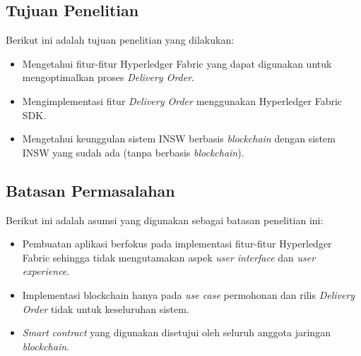 \subsection{Tujuan Penelitian}
\label{sec:tujuan}
Berikut ini adalah tujuan penelitian yang dilakukan:
\begin{itemize}
	\item Mengetahui fitur-fitur Hyperledger Fabric yang dapat digunakan untuk mengoptimalkan proses \textit{Delivery Order}.
	\item Mengimplementasi fitur \textit{Delivery Order} menggunakan Hyperledger Fabric SDK.
	\item Mengetahui keunggulan sistem INSW berbasis \textit{blockchain} dengan sistem INSW yang sudah ada (tanpa berbasis \textit{blockchain}).
\end{itemize}


\subsection{Batasan Permasalahan}
\label{sec:batasanMasalah}
Berikut ini adalah asumsi yang digunakan sebagai batasan penelitian ini:
\begin{itemize}
	\item Pembuatan aplikasi berfokus pada implementasi fitur-fitur Hyperledger Fabric sehingga tidak mengutamakan aspek \textit{user interface} dan \textit{user experience}.
	\item Implementasi blockchain hanya pada \textit{use case} permohonan dan rilis \textit{Delivery Order} tidak untuk keseluruhan sistem.
	\item \textit{Smart contract} yang digunakan disetujui oleh seluruh anggota jaringan \textit{blockchain}.

\end{itemize}



